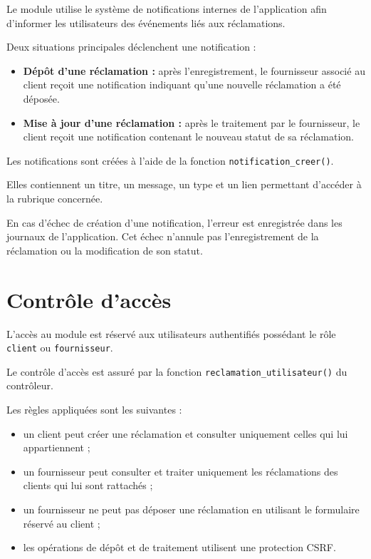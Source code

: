 Le module utilise le système de notifications internes de l'application afin d'informer les utilisateurs des événements liés aux réclamations.

Deux situations principales déclenchent une notification :

\begin{itemize}
    \item \textbf{Dépôt d'une réclamation :} après l'enregistrement, le fournisseur associé au client reçoit une notification indiquant qu'une nouvelle réclamation a été déposée.
    \item \textbf{Mise à jour d'une réclamation :} après le traitement par le fournisseur, le client reçoit une notification contenant le nouveau statut de sa réclamation.
\end{itemize}

Les notifications sont créées à l'aide de la fonction \texttt{notification\_creer()}.

Elles contiennent un titre, un message, un type et un lien permettant d'accéder à la rubrique concernée.

En cas d'échec de création d'une notification, l'erreur est enregistrée dans les journaux de l'application. Cet échec n'annule pas l'enregistrement de la réclamation ou la modification de son statut.

\section{Contrôle d'accès}

L'accès au module est réservé aux utilisateurs authentifiés possédant le rôle \texttt{client} ou \texttt{fournisseur}.

Le contrôle d'accès est assuré par la fonction \texttt{reclamation\_utilisateur()} du contrôleur.

Les règles appliquées sont les suivantes :
\begin{itemize}
    \item un client peut créer une réclamation et consulter uniquement celles qui lui appartiennent ;
    \item un fournisseur peut consulter et traiter uniquement les réclamations des clients qui lui sont rattachés ;
    \item un fournisseur ne peut pas déposer une réclamation en utilisant le formulaire réservé au client ;
    \item les opérations de dépôt et de traitement utilisent une protection CSRF.
\end{itemize}

